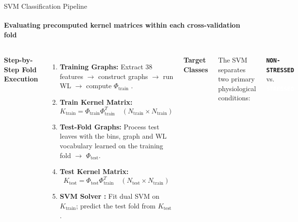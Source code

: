 \documentclass[aspectratio=169, 11pt]{beamer}
\begin{document}
\begin{frame}{SVM Classification Pipeline}
    \framesubtitle{Evaluating precomputed kernel matrices within each cross-validation fold}

    \begin{columns}[T]
        \textbf{Step-by-Step Fold Execution}
        \vspace{0.15cm}

        \begin{enumerate}\scriptsize
            \item \textbf{Training Graphs:} Extract 38 features $\rightarrow$ construct graphs $\rightarrow$ run WL $\rightarrow$ compute $\Phi_{\text{train}}$ \cite{shervashidze2011weisfeiler}.
            \item \textbf{Train Kernel Matrix:}
            \begin{equation*}
                K_{\text{train}} = \Phi_{\text{train}}\Phi_{\text{train}}^T \quad (N_{\text{train}} \times N_{\text{train}})
            \end{equation*}
            \item \textbf{Test-Fold Graphs:} Process test leaves with the bins, graph and WL vocabulary learned on the training fold $\rightarrow$ $\Phi_{\text{test}}$.
            \item \textbf{Test Kernel Matrix:}
            \begin{equation*}
                K_{\text{test}} = \Phi_{\text{test}}\Phi_{\text{train}}^T \quad (N_{\text{test}} \times N_{\text{train}})
            \end{equation*}
            \item \textbf{SVM Solver \cite{cortes1995support, chang2011libsvm}:} Fit dual SVM on $K_{\text{train}}$; predict the test fold from $K_{\text{test}}$.
        \end{enumerate}

        \textbf{Target Classes}
        \vspace{0.15cm}

        {\footnotesize The SVM separates two primary physiological conditions:}
        \begin{center}
            \colorbox{maroonSoft}{\textbf{\texttt{NON-STRESSED}}} \quad vs. \quad \colorbox{amritaMaroon}{\textcolor{white}{\textbf{\texttt{STRESSED}}}}
        \end{center}


\end{columns}
\end{frame}
\end{document}

